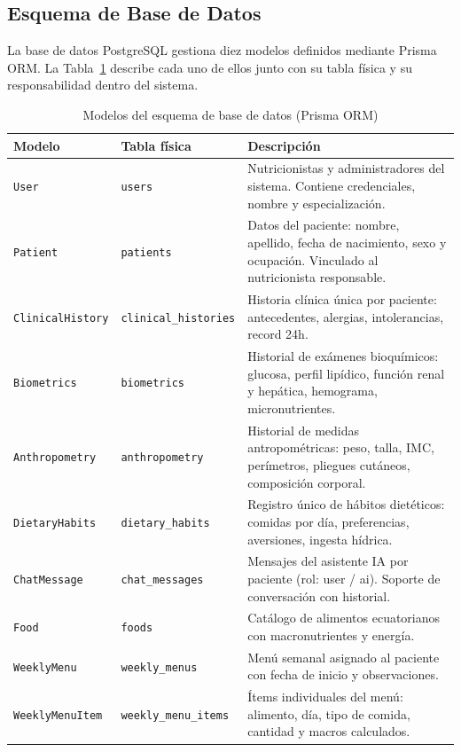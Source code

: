 \documentclass[12pt,a4paper]{article}
\begin{document}
\subsection{Esquema de Base de Datos}

La base de datos PostgreSQL gestiona diez modelos definidos mediante Prisma ORM.
La Tabla~\ref{tab:schema} describe cada uno de ellos junto con su tabla física y
su responsabilidad dentro del sistema.

\begin{table}[H]
\centering
\caption{Modelos del esquema de base de datos (Prisma ORM)}
\label{tab:schema}
\begin{tabularx}{\linewidth}{|l|l|X|}
\hline
\textbf{Modelo} & \textbf{Tabla física} & \textbf{Descripción} \\
\hline
\texttt{User}             & \texttt{users}             & Nutricionistas y administradores del sistema. Contiene credenciales, nombre y especialización. \\
\hline
\texttt{Patient}          & \texttt{patients}          & Datos del paciente: nombre, apellido, fecha de nacimiento, sexo y ocupación. Vinculado al nutricionista responsable. \\
\hline
\texttt{ClinicalHistory}  & \texttt{clinical\_histories} & Historia clínica única por paciente: antecedentes, alergias, intolerancias, record 24h. \\
\hline
\texttt{Biometrics}       & \texttt{biometrics}        & Historial de exámenes bioquímicos: glucosa, perfil lipídico, función renal y hepática, hemograma, micronutrientes. \\
\hline
\texttt{Anthropometry}    & \texttt{anthropometry}     & Historial de medidas antropométricas: peso, talla, IMC, perímetros, pliegues cutáneos, composición corporal. \\
\hline
\texttt{DietaryHabits}    & \texttt{dietary\_habits}   & Registro único de hábitos dietéticos: comidas por día, preferencias, aversiones, ingesta hídrica. \\
\hline
\texttt{ChatMessage}      & \texttt{chat\_messages}    & Mensajes del asistente IA por paciente (rol: user / ai). Soporte de conversación con historial. \\
\hline
\texttt{Food}             & \texttt{foods}             & Catálogo de alimentos ecuatorianos con macronutrientes y energía. \\
\hline
\texttt{WeeklyMenu}       & \texttt{weekly\_menus}     & Menú semanal asignado al paciente con fecha de inicio y observaciones. \\
\hline
\texttt{WeeklyMenuItem}   & \texttt{weekly\_menu\_items} & Ítems individuales del menú: alimento, día, tipo de comida, cantidad y macros calculados. \\
\hline
\end{tabularx}
\end{table}
\end{document}
